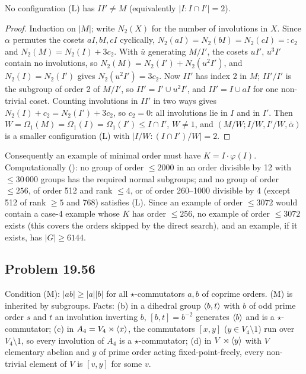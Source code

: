 \begin{lemma}\label{lem:2021T2}
No configuration (L) has $II'\ne M$ (equivalently $|I:I\cap I'|=2$).
\end{lemma}
\begin{proof}
Induction on $|M|$; write $N_2(X)$ for the number of involutions in $X$. Since $\alpha$ permutes the cosets $aI,bI,cI$
cyclically, $N_2(aI)=N_2(bI)=N_2(cI)=:c_2$ and $N_2(M)=N_2(I)+3c_2$. With $\bar u$ generating $M/I'$, the cosets $uI'$,
$u^3I'$ contain no involutions, so $N_2(M)=N_2(I')+N_2(u^2I')$, and $N_2(I)=N_2(I')$ gives $N_2(u^2I')=3c_2$. Now $II'$
has index 2 in $M$; $II'/I'$ is the subgroup of order 2 of $M/I'$, so $II'=I'\cup u^2I'$, and $II'=I\cup aI$ for one
non-trivial coset. Counting involutions in $II'$ in two ways gives $N_2(I)+c_2=N_2(I')+3c_2$, so $c_2=0$: all
involutions lie in $I$ and in $I'$. Then $W=\Omega_1(M)=\Omega_1(I)=\Omega_1(I')\le I\cap I'$, $W\ne 1$, and
$(M/W;I/W,I'/W,\bar\alpha)$ is a smaller configuration (L) with $|I/W:(I\cap I')/W|=2$.
\end{proof}
Consequently an example of minimal order must have $K=I\cdot\varphi(I)$. Computationally (): no
group of order $\le 2000$ in an order divisible by 12 with $\le 30\,000$ groups has the required normal subgroups;
and no group of order $\le 256$, of order 512 and rank $\le 4$, or of order 260--1000 divisible by 4 (except 512 of
rank $\ge 5$ and 768) satisfies (L). Since an example of order $\le 3072$ would contain a case-4 example whose $K$
has order $\le 256$, no example of order $\le 3072$ exists (this covers the orders skipped by the direct search),
and an example, if it exists, has $|G|\ge 6144$.

\subsection{Problem 19.56}\label{app:1956}
Condition (M): $|ab|\ge|a||b|$ for all $\star$-commutators $a,b$ of coprime orders. (M) is inherited by subgroups.
Facts: (b) in a dihedral group $\langle b,t\rangle$ with $b$ of odd prime order $s$ and $t$ an involution inverting $b$,
$[b,t]=b^{-2}$ generates $\langle b\rangle$ and is a $\star$-commutator; (c) in $A_4=V_4\rtimes\langle x\rangle$, the commutators
$[x,y]$ ($y\in V_4\setminus 1$) run over $V_4\setminus 1$, so every involution of $A_4$ is a $\star$-commutator;
(d) in $V\rtimes\langle y\rangle$ with $V$ elementary abelian and $y$ of prime order acting fixed-point-freely, every
non-trivial element of $V$ is $[v,y]$ for some $v$.

